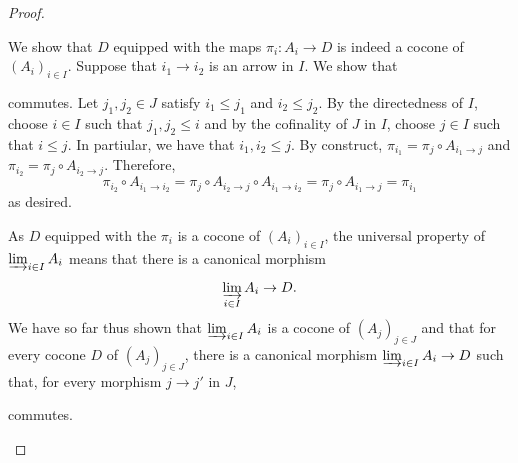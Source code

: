 \begin{proof}
\begin{enumerate}
        We show that $D$ equipped with the maps $\pi_i: A_i \to D$ is indeed a cocone of $(A_i)_{i \in I}$. Suppose that $i_1 \to i_2$ is an arrow in $I$. We show that 
        \begin{center}
        \end{center}
        commutes. Let $j_1,j_2 \in J$ satisfy $i_1 \leq j_1$ and $i_2 \leq j_2$. By the directedness of $I$, choose $i \in I$ such that $j_1,j_2 \leq i$ and by the cofinality of $J$ in $I$, choose $j \in I$ such that $i \leq j$. In partiular, we have that $i_1, i_2 \leq j$. By construct, $\pi_{i_1} = \pi_j \circ A_{i_1 \to j}$ and $\pi_{i_2} = \pi_j \circ A_{i_2 \to j}$. Therefore, 
        $$\pi_{i_2} \circ A_{i_1 \to i_2} = \pi_j \circ A_{i_2 \to j} \circ A_{i_1 \to i_2} = \pi_j \circ A_{i_1 \to j} = \pi_{i_1}$$
        as desired. 

        As $D$ equipped with the $\pi_i$ is a cocone of $(A_i)_{i \in I}$, the universal property of $\varinjlim_{i \in I} A_i$ means that there is a canonical morphism 
        $$\varinjlim_{i \in I} A_i \to D.$$
        We have so far thus shown that $\varinjlim_{i \in I} A_i$ is a cocone of $(A_j)_{j \in J}$ and that for every cocone $D$ of $(A_j)_{j \in J}$, there is a canonical morphism $\varinjlim_{i \in I} A_i \to D$ such that, for every morphism $j \to j'$ in $J$,
        \begin{center}
        \end{center}
        commutes. 
        

\end{enumerate}
\end{proof}
